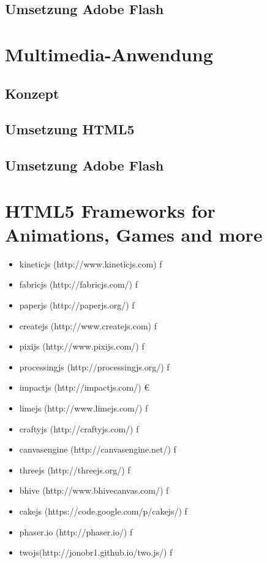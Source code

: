 \subsection{Umsetzung Adobe Flash}

\section{Multimedia-Anwendung}

\subsection{Konzept}
\subsection{Umsetzung HTML5}
\subsection{Umsetzung Adobe Flash}


\section{HTML5 Frameworks for Animations, Games and more}
\begin{itemize}
  \item kineticjs (http://www.kineticjs.com) f
  \item fabricjs (http://fabricjs.com/) f
  \item paperjs (http://paperjs.org/) f
  \item createjs (http://www.createjs.com) f
  \item pixijs (http://www.pixijs.com/) f
  \item processingjs (http://processingjs.org/) f
  \item impactjs (http://impactjs.com/) €
  \item limejs (http://www.limejs.com/) f
  \item craftyjs (http://craftyjs.com/) f
  \item canvasengine (http://canvasengine.net/) f
  \item threejs (http://threejs.org/) f
  \item bhive (http://www.bhivecanvas.com/) f
  \item cakejs (https://code.google.com/p/cakejs/) f
  \item phaser.io (http://phaser.io/) f
  \item twojs(http://jonobr1.github.io/two.js/) f
\end{itemize}